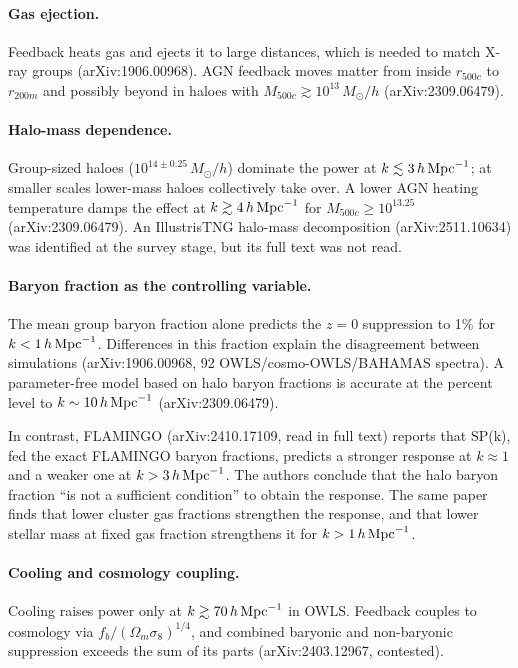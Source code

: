 \documentclass[11pt,a4paper]{article}
\begin{document}
\paragraph{Gas ejection.} Feedback heats gas and ejects it to large distances, which is needed to match X-ray groups (arXiv:1906.00968). AGN feedback moves matter from inside $r_{500c}$ to $r_{200m}$ and possibly beyond in haloes with $M_{500c}\gtrsim10^{13}\,M_\odot/h$ (arXiv:2309.06479).

\paragraph{Halo-mass dependence.} Group-sized haloes ($10^{14\pm0.25}\,M_\odot/h$) dominate the power at $k\lesssim3\,h\,{\rm Mpc}^{-1}$; at smaller scales lower-mass haloes collectively take over. A lower AGN heating temperature damps the effect at $k\gtrsim4\,h\,{\rm Mpc}^{-1}$ for $M_{500c}\ge10^{13.25}$ (arXiv:2309.06479). An IllustrisTNG halo-mass decomposition (arXiv:2511.10634) was identified at the survey stage, but its full text was not read.

\paragraph{Baryon fraction as the controlling variable.} The mean group baryon fraction alone predicts the $z=0$ suppression to 1\% for $k<1\,h\,{\rm Mpc}^{-1}$. Differences in this fraction explain the disagreement between simulations (arXiv:1906.00968, 92 OWLS/cosmo-OWLS/BAHAMAS spectra). A parameter-free model based on halo baryon fractions is accurate at the percent level to $k\sim10\,h\,{\rm Mpc}^{-1}$ (arXiv:2309.06479).

In contrast, FLAMINGO (arXiv:2410.17109, read in full text) reports that SP(k), fed the exact FLAMINGO baryon fractions, predicts a stronger response at $k\approx1$ and a weaker one at $k>3\,h\,{\rm Mpc}^{-1}$. The authors conclude that the halo baryon fraction ``is not a sufficient condition'' to obtain the response. The same paper finds that lower cluster gas fractions strengthen the response, and that lower stellar mass at fixed gas fraction strengthens it for $k>1\,h\,{\rm Mpc}^{-1}$.

\paragraph{Cooling and cosmology coupling.} Cooling raises power only at $k\gtrsim70\,h\,{\rm Mpc}^{-1}$ in OWLS. Feedback couples to cosmology via $f_b/(\Omega_m\sigma_8)^{1/4}$, and combined baryonic and non-baryonic suppression exceeds the sum of its parts (arXiv:2403.12967, contested).
\end{document}
